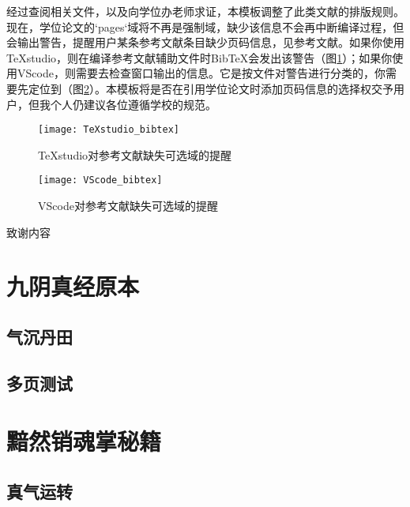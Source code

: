 \documentclass[print, doctor, vlined]{DissertUESTC}
\begin{document}
\begin{itemize}
		经过查阅相关文件，以及向学位办老师求证，本模板调整了此类文献的排版规则。现在，学位论文的`pages`域将不再是强制域，缺少该信息不会再中断编译过程，但会输出警告，提醒用户某条参考文献条目缺少页码信息，见参考文献\cite{陈念永2001毫米波细胞生物效应及抗肿瘤研究无页码}。如果你使用TeXstudio，则在编译参考文献辅助文件时BibTeX会发出该警告（图\ref{fig: TeXstudio对参考文献缺失信息的提醒}）；如果你使用VScode，则需要去检查窗口输出的信息。它是按文件对警告进行分类的，你需要先定位到（图\ref{fig: VScode对参考文献缺失信息的提醒}）。本模板将是否在引用学位论文时添加页码信息的选择权交予用户，但我个人仍建议各位遵循学校的规范。
	\end{itemize}
	
	\begin{figure}[!h]
		\centering
		\texttt{[image: TeXstudio\_bibtex]}
		\caption{TeXstudio对参考文献缺失可选域的提醒} \label{fig: TeXstudio对参考文献缺失信息的提醒}
	\end{figure}
	\begin{figure}[!h]
		\centering
		\texttt{[image: VScode\_bibtex]}
		\caption{VScode对参考文献缺失可选域的提醒} \label{fig: VScode对参考文献缺失信息的提醒}
	\end{figure}
	
	\acknowledgement
	

	致谢内容

	
	
	
	
	\appendix
	
	\chapter{九阴真经原本}
	\section{气沉丹田}
	\newpage
	\section{多页测试}
	
	\chapter{黯然销魂掌秘籍}
	\section{真气运转}
	\newpage
\end{document}
